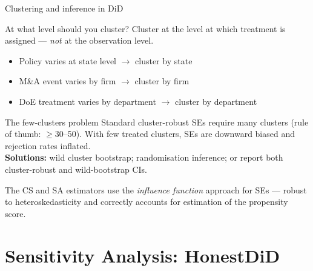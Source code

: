 \documentclass[aspectratio=169, 10pt]{beamer}
\begin{document}
\begin{frame}{Clustering and inference in DiD}

  \begin{block}{At what level should you cluster?}
    Cluster at the level at which treatment is assigned — \emph{not} at the observation level.
    \begin{itemize}
      \item Policy varies at state level $\rightarrow$ cluster by state
      \item M\&A event varies by firm $\rightarrow$ cluster by firm
      \item DoE treatment varies by department $\rightarrow$ cluster by department
    \end{itemize}
  \end{block}

  \begin{alertblock}{The few-clusters problem}
    Standard cluster-robust SEs require many clusters (rule of thumb: $\geq 30$--50).
    With few treated clusters, SEs are downward biased and rejection rates inflated.\\[4pt]
    \textbf{Solutions:} wild cluster bootstrap; randomisation inference;
    or report both cluster-robust and wild-bootstrap CIs.
  \end{alertblock}

  \medskip
  The CS and SA estimators use the \emph{influence function} approach for SEs —
  robust to heteroskedasticity and correctly accounts for estimation of the propensity score.

\end{frame}

\section{Sensitivity Analysis: HonestDiD}
\end{document}
